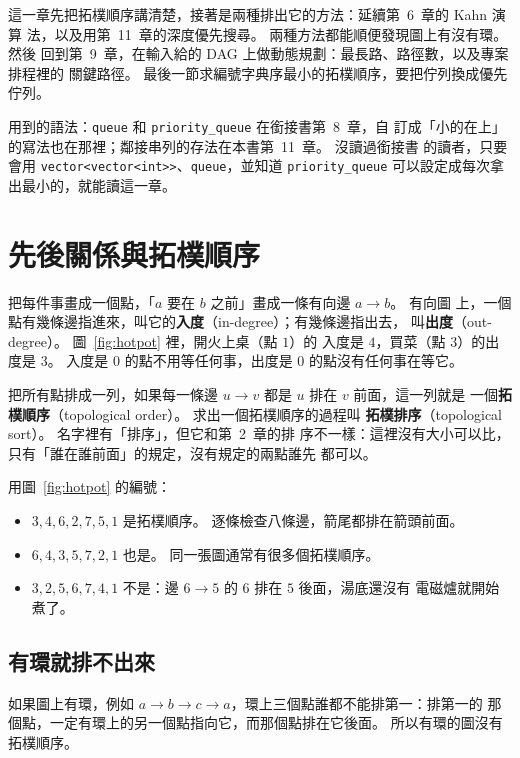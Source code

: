 這一章先把拓樸順序講清楚，接著是兩種排出它的方法：延續第~6~章的 Kahn 演算
法，以及用第~11~章的深度優先搜尋。 兩種方法都能順便發現圖上有沒有環。 然後
回到第~9~章，在輸入給的 DAG 上做動態規劃：最長路、路徑數，以及專案排程裡的
關鍵路徑。 最後一節求編號字典序最小的拓樸順序，要把佇列換成優先佇列。

用到的語法：\texttt{queue} 和 \texttt{priority\_queue} 在銜接書第~8~章，自
訂成「小的在上」的寫法也在那裡；鄰接串列的存法在本書第~11~章。 沒讀過銜接書
的讀者，只要會用 \texttt{vector<vector<int>>}、\texttt{queue}，並知道
\texttt{priority\_queue} 可以設定成每次拿出最小的，就能讀這一章。

\section{先後關係與拓樸順序}
\label{sec:topo-order}

把每件事畫成一個點，「$a$ 要在 $b$ 之前」畫成一條有向邊 $a \to b$。 有向圖
上，一個點有幾條邊指進來，叫它的\textbf{入度}（in-degree）；有幾條邊指出去，
叫\textbf{出度}（out-degree）。 圖~\ref{fig:hotpot} 裡，開火上桌（點 $1$）的
入度是 $4$，買菜（點 $3$）的出度是 $3$。 入度是 $0$ 的點不用等任何事，出度是
$0$ 的點沒有任何事在等它。

把所有點排成一列，如果每一條邊 $u \to v$ 都是 $u$ 排在 $v$ 前面，這一列就是
一個\textbf{拓樸順序}（topological order）。 求出一個拓樸順序的過程叫
\textbf{拓樸排序}（topological sort）。 名字裡有「排序」，但它和第~2~章的排
序不一樣：這裡沒有大小可以比，只有「誰在誰前面」的規定，沒有規定的兩點誰先
都可以。

用圖~\ref{fig:hotpot} 的編號：

\begin{itemize}
\item $3, 4, 6, 2, 7, 5, 1$ 是拓樸順序。 逐條檢查八條邊，箭尾都排在箭頭前面。
\item $6, 4, 3, 5, 7, 2, 1$ 也是。 同一張圖通常有很多個拓樸順序。
\item $3, 2, 5, 6, 7, 4, 1$ 不是：邊 $6 \to 5$ 的 $6$ 排在 $5$ 後面，湯底還沒有
電磁爐就開始煮了。
\end{itemize}

\subsection{有環就排不出來}

如果圖上有環，例如 $a \to b \to c \to a$，環上三個點誰都不能排第一：排第一的
那個點，一定有環上的另一個點指向它，而那個點排在它後面。 所以有環的圖沒有
拓樸順序。

